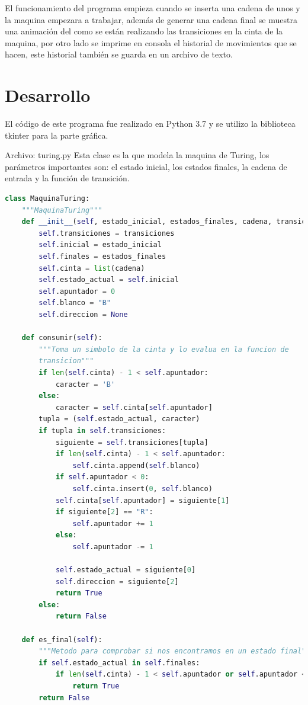 \documentclass[a4paper,12pt]{article}
\begin{document}
El funcionamiento del programa empieza cuando se inserta una cadena de unos y la maquina empezara a trabajar, además de generar una cadena final se muestra una animación del como se están realizando las transiciones en la cinta de la maquina, por otro lado se imprime en consola el historial de movimientos que se hacen, este historial también se guarda en un archivo de texto.

\section{Desarrollo}
El código de este programa fue realizado en Python 3.7 y se utilizo la biblioteca tkinter para la parte gráfica.

Archivo: turing.py
Esta clase es la que modela la maquina de Turing, los parámetros importantes son: el estado inicial, los estados finales, la cadena de entrada y la función de transición.
\begin{lstlisting}[language=Python]
class MaquinaTuring:
    """MaquinaTuring"""
    def __init__(self, estado_inicial, estados_finales, cadena, transiciones):
        self.transiciones = transiciones
        self.inicial = estado_inicial
        self.finales = estados_finales
        self.cinta = list(cadena)
        self.estado_actual = self.inicial
        self.apuntador = 0
        self.blanco = "B"
        self.direccion = None

    def consumir(self):
        """Toma un simbolo de la cinta y lo evalua en la funcion de
        transicion"""
        if len(self.cinta) - 1 < self.apuntador:
            caracter = 'B'
        else:
            caracter = self.cinta[self.apuntador]
        tupla = (self.estado_actual, caracter)
        if tupla in self.transiciones:
            siguiente = self.transiciones[tupla]
            if len(self.cinta) - 1 < self.apuntador:
                self.cinta.append(self.blanco)
            if self.apuntador < 0:
                self.cinta.insert(0, self.blanco)
            self.cinta[self.apuntador] = siguiente[1]
            if siguiente[2] == "R":
                self.apuntador += 1
            else:
                self.apuntador -= 1

            self.estado_actual = siguiente[0]
            self.direccion = siguiente[2]
            return True
        else:
            return False

    def es_final(self):
        """Metodo para comprobar si nos encontramos en un estado final"""
        if self.estado_actual in self.finales:
            if len(self.cinta) - 1 < self.apuntador or self.apuntador < 0:
                return True
        return False
\end{lstlisting}
\end{document}
